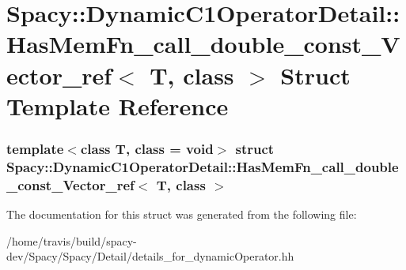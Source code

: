 \hypertarget{structSpacy_1_1DynamicC1OperatorDetail_1_1HasMemFn__call__double__const__Vector__ref}{\section{\-Spacy\-:\-:\-Dynamic\-C1\-Operator\-Detail\-:\-:\-Has\-Mem\-Fn\-\_\-call\-\_\-double\-\_\-const\-\_\-\-Vector\-\_\-ref$<$ \-T, class $>$ \-Struct \-Template \-Reference}
\label{structSpacy_1_1DynamicC1OperatorDetail_1_1HasMemFn__call__double__const__Vector__ref}
}
\subsubsection*{template$<$class T, class = void$>$ struct Spacy\-::\-Dynamic\-C1\-Operator\-Detail\-::\-Has\-Mem\-Fn\-\_\-call\-\_\-double\-\_\-const\-\_\-\-Vector\-\_\-ref$<$ T, class $>$}



\-The documentation for this struct was generated from the following file\-:\begin{DoxyCompactItemize}
\item 
/home/travis/build/spacy-\/dev/\-Spacy/\-Spacy/\-Detail/details\-\_\-for\-\_\-dynamic\-Operator.\-hh\end{DoxyCompactItemize}
